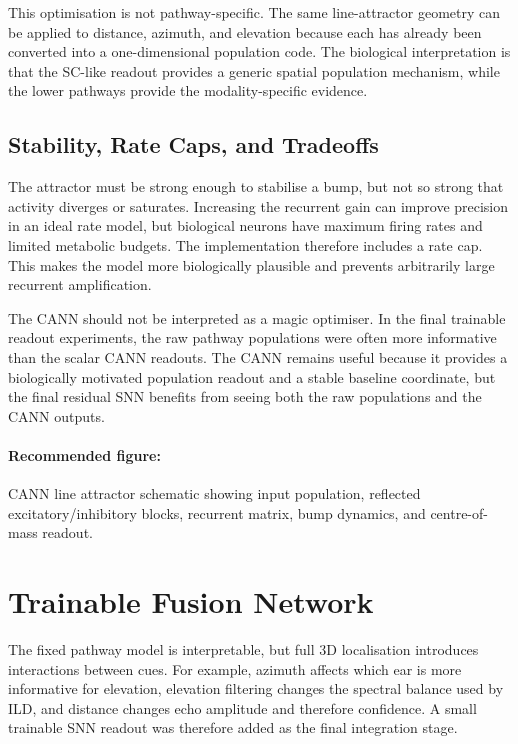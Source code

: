 This optimisation is not pathway-specific. The same line-attractor geometry can be applied to distance, azimuth, and elevation because each has already been converted into a one-dimensional population code. The biological interpretation is that the SC-like readout provides a generic spatial population mechanism, while the lower pathways provide the modality-specific evidence.

\subsection{Stability, Rate Caps, and Tradeoffs}

The attractor must be strong enough to stabilise a bump, but not so strong that activity diverges or saturates. Increasing the recurrent gain can improve precision in an ideal rate model, but biological neurons have maximum firing rates and limited metabolic budgets. The implementation therefore includes a rate cap. This makes the model more biologically plausible and prevents arbitrarily large recurrent amplification.

The CANN should not be interpreted as a magic optimiser. In the final trainable readout experiments, the raw pathway populations were often more informative than the scalar CANN readouts. The CANN remains useful because it provides a biologically motivated population readout and a stable baseline coordinate, but the final residual SNN benefits from seeing both the raw populations and the CANN outputs.

\paragraph{Recommended figure:} CANN line attractor schematic showing input population, reflected excitatory/inhibitory blocks, recurrent matrix, bump dynamics, and centre-of-mass readout.

\section{Trainable Fusion Network}

The fixed pathway model is interpretable, but full 3D localisation introduces interactions between cues. For example, azimuth affects which ear is more informative for elevation, elevation filtering changes the spectral balance used by ILD, and distance changes echo amplitude and therefore confidence. A small trainable SNN readout was therefore added as the final integration stage.

